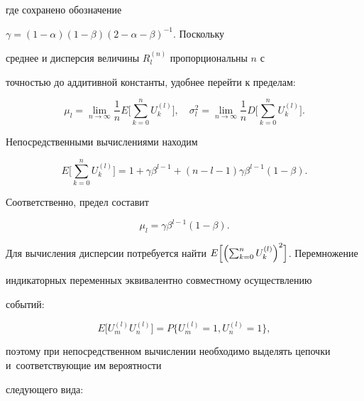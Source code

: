 где сохранено обозначение \cite{barvinok:bib1,barvinok:bib3}

$\gamma ={(1-\alpha)(1-\beta)}({2-\alpha -\beta})^{-1}$. Поскольку

среднее и дисперсия величины $R_l^{(n)}$ пропорциональны $n$ с

точностью до аддитивной константы, удобнее перейти к пределам:

$$

\mu _l =\lim \limits_{n\to \infty} \frac{1}{n} E \biggl[

\sum\limits_{k=0}^n U_k^{(l)}  \biggr], \quad \sigma _l^2 = \lim

\limits_{n\to \infty } \frac{1}{n} D\biggl[ \sum\limits_{k=0}^n

U_k^{(l)}\biggr]. $$

Непосредственными вычислениями находим

\begin{equation}

\label{barvinok:eq3} E\biggl[ \sum\limits_{k=0}^n U_k^{(l)}

\biggr]=1+\gamma \beta ^{l-1}+( n-l-1)\gamma \beta ^{l-1} (1-\beta

).

\end{equation}

Соответственно, предел составит

\begin{equation}

\label{barvinok:eq4}

 \mu _l =\gamma \beta ^{l-1} (1-\beta).

\end{equation}

Для вычисления дисперсии потребуется найти $E\Bigl[ \left(

\sum_{k=0}^n U_k^{(l)} \right)^2\Bigr]$. Перемножение

индикаторных переменных эквивалентно совместному осуществлению

событий: 

$$E \bigl[ U_m^{(l)} U_n^{(l)} \bigr]=P\bigl\{ U_m^{(l)}

=1, U_n^{(l)} =1 \bigr\},$$ 

поэтому при непосредственном вычислении необходимо выделять цепочки и~соответствующие им вероятности

следующего вида:

